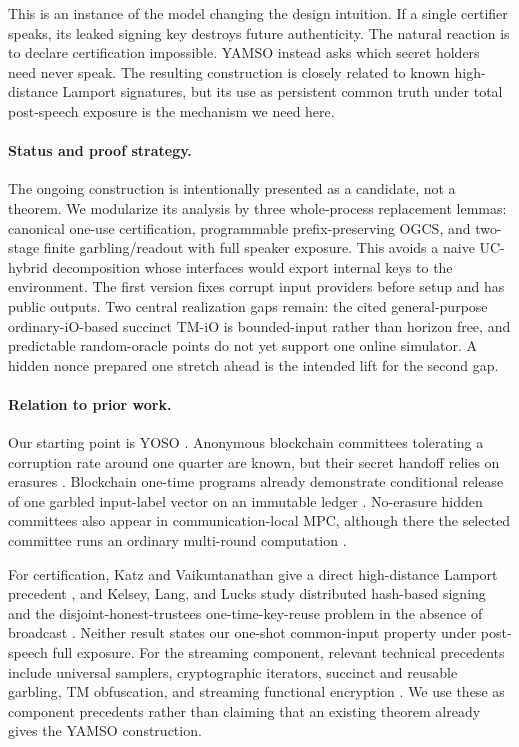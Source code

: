 This is an instance of the model changing the design intuition. If a single
certifier speaks, its leaked signing key destroys future authenticity. The
natural reaction is to declare certification impossible. YAMSO instead asks
which secret holders need never speak. The resulting construction is closely
related to known high-distance Lamport signatures, but its use as persistent
common truth under total post-speech exposure is the mechanism we need here.

\paragraph{Status and proof strategy.}
The ongoing construction is intentionally presented as a candidate, not a
theorem. We modularize its analysis by three whole-process replacement lemmas:
canonical one-use certification, programmable prefix-preserving OGCS, and
two-stage finite garbling/readout with full speaker exposure. This avoids a
naive UC-hybrid decomposition whose interfaces would export internal keys to
the environment. The first version fixes corrupt input providers before setup
and has public outputs. Two central realization gaps remain: the cited
general-purpose ordinary-iO-based succinct TM-iO is bounded-input rather
than horizon free, and predictable random-oracle points do not yet support
one online simulator. A hidden nonce prepared one
stretch ahead is the intended lift for the second gap.

\paragraph{Relation to prior work.}
Our starting point is YOSO \cite{GentryEtAl2021YOSOFull}. Anonymous blockchain
committees tolerating a corruption rate around one quarter are known, but
their secret handoff relies on erasures
\cite{BenhamoudaEtAl2020BlockchainSecret}. Blockchain one-time programs
already demonstrate conditional release of one garbled input-label vector on
an immutable ledger \cite{GoyalGoyal2017Blockchains}. No-erasure hidden
committees also appear in communication-local MPC, although there the selected
committee runs an ordinary multi-round computation
\cite{ChandranEtAl2024CommunicationLocalMPC}.

For certification, Katz and Vaikuntanathan give a direct high-distance
Lamport precedent \cite{KatzVaikuntanathan2009LeakageSignatures}, and Kelsey,
Lang, and Lucks study distributed hash-based signing and the
disjoint-honest-trustees one-time-key-reuse problem in the absence of
broadcast \cite{KelseyLangLucks2025DistributedHBS}. Neither result states
our one-shot common-input property under post-speech full exposure. For the
streaming component, relevant technical precedents include universal samplers,
cryptographic iterators, succinct and reusable garbling, TM obfuscation, and
streaming functional encryption
\cite{HofheinzEtAl2014UniversalSamplers,KoppulaLewkoWaters2014IOTM,%
LinPass2014SuccinctGarbling,GoldwasserEtAl2013TuringMachines,%
GuanKorbSahai2022StreamingFE}. We use these as component precedents rather
than claiming that an existing theorem already gives the YAMSO construction.
